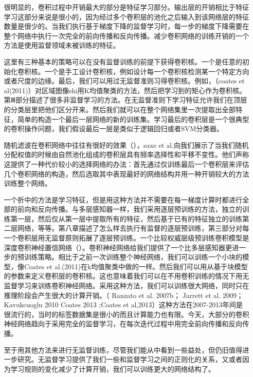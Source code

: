 很明显的，卷积过程中开销最大的部分是特征学习部分。输出层的开销相比于特征学习这部分来说是很小的，因为经过多个卷积层的池化之后输入到该网络层的特征数量是很少的。当我们执行基于梯度下降的监督学习时，每一步的梯度下降需要在整个网络中执行一次完全的前向传播和反向传播。减少卷积网络的训练开销的一个方法是使用监督领域未被训练的特征。

    这里有三种基本的策略可以在没有监督训练的前提下获得卷积核。一个是任意的初始化卷积核。一个是手工设计卷积核，例如设计每一个卷积核检测某一个特定方向或者尺度的边缘。最后，我们可以用过无监督准则习得卷积核。例如，（coates et al(2011)）对区域图像shi用K均值聚类的方法，然后把学习到的矩心作为卷积核。第Ⅲ部分描述了很多非监督学习的方法。在无监督准则下学习特征允许我们在顶层的分类层里把他们区分开来。然后我们就可以在整个网络集里一次提取出全部特征，简单的构造一个最后一层网络的新的训练集。学习最后的卷积层是一个很典型的卷积操作问题，我们假设最后一层是类似于逻辑回归或者SVM分类器。
    
    随机滤波在卷积网络中往往有很好的效果（），saxe et al.向我们展示了当我们随机分配权值的时候由自然池化组成的卷积层具有频率选择性和平移不变性。他们声称这提供了一种代价较小的选择网络的办法：首先通过仅训练最后一个卷积层来评估几个卷积网络的构造，然后选取其中表现最好的网络结构并用一种开销较大的方法训练整个网络。
    
    一个折中的方法是学习特征，但是用这种方法并不需要在每一梯度计算时都进行全部的前向和反向传播。与多层感知器一样，我们采用逐层预训练的方法，独立的训练第一层，然后仅从第一层中提取所有的特征，然后基于已有的特征独立的训练第二层网络，等等。第八章描述了怎么样去执行有监督的逐层预训练，第三部分对每一个卷积层用无监督原则拓展了逐层预训练。一个比较权威层级预训练卷积模型是深度卷积神经置信网络（）。卷积神经网络给我们提供了一个比多层感知器更进一步的预训练策略。相比于之前一次训练整个神经网络，我们可以训练一个小块的模型，像Coates et al.(2011)在k均值聚类中做的一样。然后我们可以用从基于块模型的参数来定义卷积层的卷积核。这也意味着我们可以在不用卷积训练的情况下用无监督学习来训练卷积神经网络。采用这种方法，我们可以训练很大网络，同时只在推理阶段会产生很大的计算开销。（ Ranzato et al. 2007b； Jarrett et al. 2009； Kavukcuoglu 2010 Coates 2013 ;Coates et al,2013）这种方法在2007-2013年间是很流行的，当时的标签数据集是很小的而且计算能力也有限。今天，大部分的卷积神经网络趋向于采用完全的监督学习，在每次迭代过程中用完全前向传播和反向传播。
 
   至于用其他方法来进行无监督训练，尽管我们能从中看到一些益处，但仍旧值得进一步研究。无监督学习提供了我们一些和监督学习之间的正则化的关系，又或者因为学习规则的变化减少了计算开销，我们可以训练更大的网络结构了。
   
   





